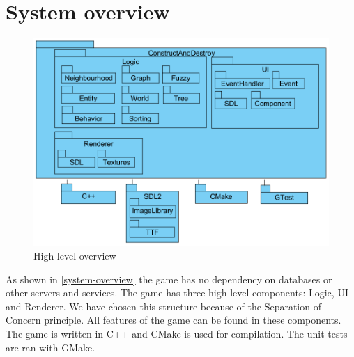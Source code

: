 
\section{System overview}

\begin{figure}[!htb]
    \centering
    \includegraphics[scale=0.75]{res/high-level-overview.png}
    \caption{High level overview}\label{fig:system-overview}
\end{figure}

As shown in \cref{system-overview} the game has no dependency on databases or other servers and services. The game has three high level components: Logic, UI and Renderer. We have chosen this structure because of the Separation of Concern principle. All features of the game can be found in these components. The game is written in C++ and CMake is used for compilation. The unit tests are ran with GMake.